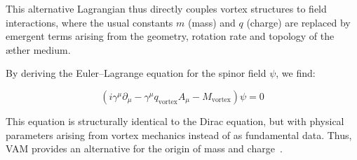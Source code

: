 This alternative Lagrangian thus directly couples vortex structures to field interactions, where the usual constants \( m \) (mass) and \( q \) (charge) are replaced by emergent terms arising from the geometry, rotation rate and topology of the æther medium.

By deriving the Euler–Lagrange equation for the spinor field \( \psi \), we find:

\begin{equation}
    \boxed{ \left( i \gamma^\mu \partial_\mu - \gamma^\mu q_{\text{vortex}} A_\mu - M_{\text{vortex}} \right)\psi = 0 }
\end{equation}

This equation is structurally identical to the Dirac equation, but with physical parameters arising from vortex mechanics instead of as fundamental data. Thus, VAM provides an alternative for the origin of mass and charge~\cite{Barcelo2011,Volovik2003}.